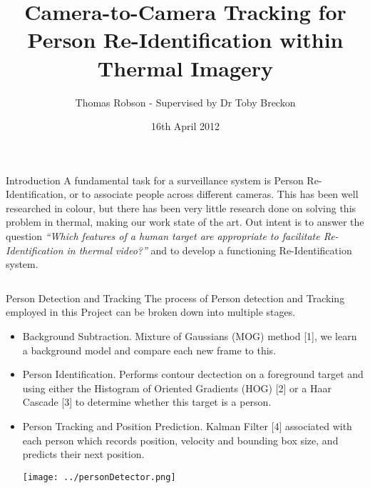 \documentclass[final]{beamer}
\title[Thermal Re-ID]{Camera-to-Camera Tracking for Person Re-Identification within Thermal Imagery}
\author[G Ingram]{Thomas Robson - Supervised by Dr Toby Breckon}
\institute[Durham]{School of Engineering and Computing Sciences, Durham University}
\date{16th April 2012}
\begin{document}
  \begin{frame}{} 
	
	 \begin{block}{Introduction}
	 \vspace{-.5cm}
  \justify
          A fundamental task for a surveillance system is Person Re-Identification, or to associate people across different cameras. This has been well researched in colour, but there has been very little research done on solving this problem in thermal, making our work state of the art. 
\justify
Out intent is to answer the question {\textit{``Which features of a human target are appropriate to facilitate Re-Identification in thermal video?''}} and to develop a functioning Re-Identification system.
        \end{block}
        
    \begin{columns}[t]
      \begin{column}{.49\linewidth}
      
     
        
        \begin{block}{Person Detection and Tracking}
        	The process of Person detection and Tracking employed in this Project can be broken down into multiple stages. 
        	\begin{itemize}
        	\item Background Subtraction. Mixture of Gaussians (MOG) method [1], we learn a background model and compare each new frame to this. 

        	\item Person Identification. Performs contour dectection on a foreground target and using either the Histogram of Oriented Gradients (HOG) [2] or a Haar Cascade [3] to determine whether this target is a person.
        	
        	\item Person Tracking and Position Prediction. Kalman Filter [4] associated with each person which records position, velocity and bounding box size, and predicts their next position. 
        	
        \texttt{[image: ../personDetector.png]}  
          \end{itemize}
        \end{block}




\end{column}
\end{columns}
\end{frame}
\end{document}
